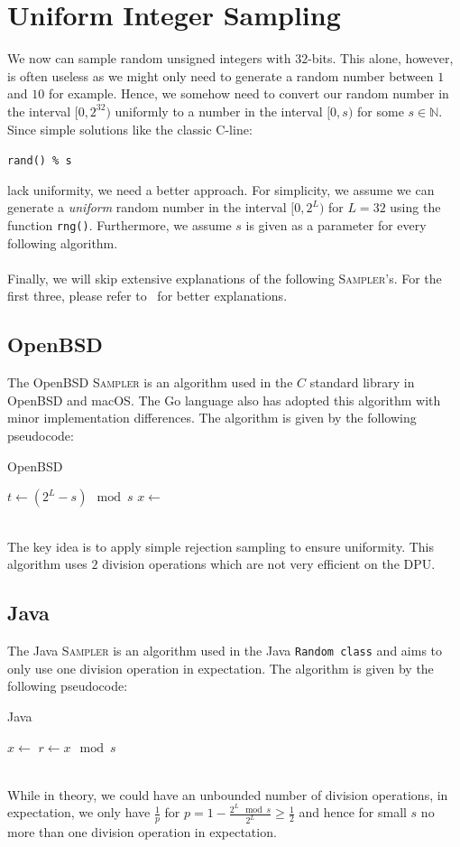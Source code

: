 \documentclass[a4paper]{scrartcl}
\begin{document}
\section{Uniform Integer Sampling} \label{sec:3}
We now can sample random unsigned integers with $32$-bits.
This alone, however, is often useless as we might only need to generate a random number between $1$ and $10$ for example.
Hence, we somehow need to convert our random number in the interval $[0,2^{32})$ uniformly to a number in the interval $[0,s)$ for some $s \in \mathbb{N}$.
Since simple solutions like the classic C-line:
\begin{center}
    \texttt{rand() \% s}
\end{center}
lack uniformity, we need a better approach. 
For simplicity, we assume we can generate a \emph{uniform} random number in the interval $[0,2^L)$ for $L = 32$ using the function \texttt{rng()}.
Furthermore, we assume $s$ is given as a parameter for every following algorithm.
\\
\\
Finally, we will skip extensive explanations of the following \textsc{Sampler}'s.
For the first three, please refer to~\cite*{Lemire} for better explanations.


\subsection{OpenBSD} \label{sec:3.1}
The OpenBSD \textsc{Sampler} is an algorithm used in the $C$ standard library in OpenBSD and macOS.
The Go language also has adopted this algorithm with minor implementation differences.
The algorithm is given by the following pseudocode: 
\begin{algorithm}
    \caption{OpenBSD}
    $t \leftarrow (2^L - s) \mod s$\;
    $x \leftarrow$ \RNG\;
    \;
\end{algorithm}
\\
The key idea is to apply simple rejection sampling to ensure uniformity.
This algorithm uses $2$ division operations which are not very efficient on the DPU.


\subsection{Java} \label{sec:3.2}
The Java \textsc{Sampler} is an algorithm used in the Java \texttt{Random class} and aims to only use one division operation in expectation.
The algorithm is given by the following pseudocode: 
\begin{algorithm}
    \caption{Java}
    $x \leftarrow$ \RNG\;
    $r \leftarrow x \mod s$\;
    \;
\end{algorithm}
\\
While in theory, we could have an unbounded number of division operations, in expectation, we only have $\frac{1}{p}$ for $p = 1 - \frac{2^L \mod s}{2^L} \geq \frac{1}{2}$ and hence for small $s$ no more than one division operation in expectation.
\end{document}
